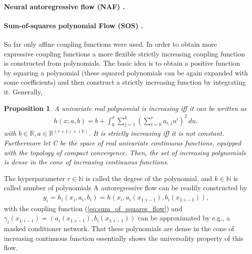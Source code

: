 \documentclass[12pt,a4paper]{article}
\newtheorem{proposition}{Proposition}
\begin{document}
\paragraph{Neural autoregressive flow (NAF) \cite{huang_2018_neural_autoregressive_flows}.} 

\paragraph{Sum-of-squares polynomial Flow (SOS) \cite{jaini_polynomial_flow_2019}.}
So far only affine coupling functions were used. In order to obtain more expressive coupling functions a more flexible strictly increasing coupling function is constructed from polynomials. The basic idea is to obtain a positive function by squaring a polynomial (these squared polynomials can be again expanded with some coefficients) and then construct a strictly increasing function by integrating it. Generally,
\begin{proposition}{\cite{jaini_polynomial_flow_2019}}
	A univariate real polynomial is increasing iff it can be written as
	\begin{align}\label{eq:sum_of_squares_flow}
		h (x; a, b) = b + \int_0^x\sum_{j=1}^k \left(\sum_{i=0}^r a_{i, j} u^i \right) ^2 \, du,
	\end{align}
	with $b\in \mathbb{R},  a\in\mathbb{R}^{(r+1)\times (k)}$. It is strictly increasing iff it is not constant.
	Furthermore let C be the space of real univariate continuous functions, equipped with the topology of compact convergence. Then, the set of increasing polynomials is dense
	in the cone of increasing continuous functions.
\end{proposition}
The hyperparameter $r\in \mathbb{N}$ is called the degree of the polynomial, and $k\in \mathbb{N}$  is called number of polynomials
A autoregressive flow can be readily constructed by
\begin{align}
	y_i = h_i(x_i, a_i, b_i) = h(x_i, a_i(x_{1:i-1}), b_i(x_{1:i-1})), 
\end{align}
with the coupling function (\ref{eq:sum_of_squares_flow}) and 
$\gamma_i(x_{1:i-1}) = (a_i(x_{1:i-1}), b_i(x_{1:i-1}))$ can be approximated by e.g., a masked conditioner network. 
That these polynomials are dense in the cone of increasing continuous function essentially shows the universality property of this flow. 
\end{document}
